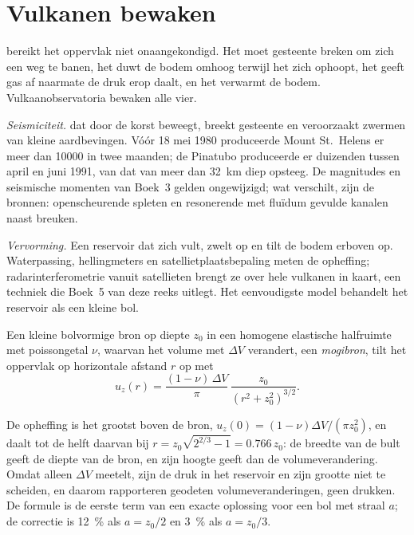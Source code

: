 \section{Vulkanen bewaken}

 bereikt het oppervlak niet onaangekondigd. Het moet gesteente breken om zich een
weg te banen, het duwt de bodem omhoog terwijl het zich ophoopt, het geeft gas af naarmate de druk
erop daalt, en het verwarmt de bodem. Vulkaanobservatoria bewaken alle vier.

\emph{Seismiciteit.}  dat door de korst beweegt, breekt gesteente en veroorzaakt zwermen
van kleine aardbevingen. Vóór 18 mei 1980 produceerde Mount St.~Helens er meer dan
\num{10000} in twee maanden; de Pinatubo produceerde er duizenden tussen april en
juni 1991, van  dat van meer dan \qty{32}{km} diep opsteeg. De magnitudes
en seismische momenten van Boek~3 gelden ongewijzigd; wat verschilt, zijn de
bronnen: openscheurende spleten en resonerende met fluïdum gevulde kanalen naast breuken.

\emph{Vervorming.} Een reservoir dat zich vult, zwelt op en tilt de bodem erboven
op. Waterpassing, hellingmeters en satellietplaatsbepaling meten de opheffing; radarinterferometrie vanuit satellieten brengt ze over hele
vulkanen in kaart, een techniek die Boek~5 van deze reeks uitlegt. Het eenvoudigste
model behandelt het reservoir als een kleine bol.

\begin{proposition}[Mogibron]\label{prop:b2:eruptive-styles:mogi}
Een kleine bolvormige bron op diepte $z_0$ in een homogene elastische halfruimte
met poissongetal $\nu$, waarvan het volume met $\Delta V$ verandert, een
\emph{mogibron}, tilt het oppervlak op horizontale afstand $r$ op
met
\[
u_z(r) = \frac{(1 - \nu)\,\Delta V}{\pi}\,\frac{z_0}{(r^2 + z_0^2)^{3/2}} .
\]
\end{proposition}
\admitted

De opheffing is het grootst boven de bron, $u_z(0) = (1 - \nu)\Delta V/(\pi z_0^2)$, en
daalt tot de helft daarvan bij $r = z_0\sqrt{2^{2/3} - 1} = 0.766\,z_0$: de breedte van de
bult geeft de diepte van de bron, en zijn hoogte geeft dan de
volumeverandering. Omdat alleen $\Delta V$ meetelt, zijn de druk in het reservoir en zijn grootte
niet te scheiden, en daarom rapporteren geodeten volumeveranderingen, geen drukken.
De formule is de eerste term van een exacte oplossing voor een bol met straal
$a$; de correctie is \qty{12}{\percent} als $a = z_0/2$ en \qty{3}{\percent}
als $a = z_0/3$.

